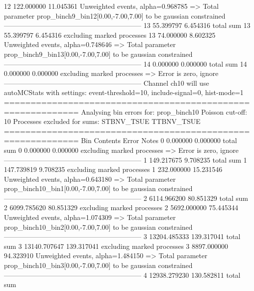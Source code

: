 12         122.000000      11.045361       Unweighted events, alpha=0.968785
  => Total parameter prop_binch9_bin12[0.00,-7.00,7.00] to be gaussian constrained
------------------------------------------------------------
13         55.399797       6.454316        total sum                     
13         55.399797       6.454316        excluding marked processes    
13         74.000000       8.602325        Unweighted events, alpha=0.748646
  => Total parameter prop_binch9_bin13[0.00,-7.00,7.00] to be gaussian constrained
------------------------------------------------------------
14         0.000000        0.000000        total sum                     
14         0.000000        0.000000        excluding marked processes    
  => Error is zero, ignore      
------------------------------------------------------------
Channel ch10 will use autoMCStats with settings: event-threshold=10, include-signal=0, hist-mode=1
============================================================
Analysing bin errors for: prop_binch10
Poisson cut-off: 10
Processes excluded for sums: STBNV_TSUE TTBNV_TSUE
============================================================
Bin        Contents        Error           Notes                         
0          0.000000        0.000000        total sum                     
0          0.000000        0.000000        excluding marked processes    
  => Error is zero, ignore      
------------------------------------------------------------
1          149.217675      9.708235        total sum                     
1          147.739819      9.708235        excluding marked processes    
1          232.000000      15.231546       Unweighted events, alpha=0.643180
  => Total parameter prop_binch10_bin1[0.00,-7.00,7.00] to be gaussian constrained
------------------------------------------------------------
2          6114.966200     80.851329       total sum                     
2          6099.785620     80.851329       excluding marked processes    
2          5692.000000     75.445344       Unweighted events, alpha=1.074309
  => Total parameter prop_binch10_bin2[0.00,-7.00,7.00] to be gaussian constrained
------------------------------------------------------------
3          13204.485333    139.317041      total sum                     
3          13140.707647    139.317041      excluding marked processes    
3          8897.000000     94.323910       Unweighted events, alpha=1.484150
  => Total parameter prop_binch10_bin3[0.00,-7.00,7.00] to be gaussian constrained
------------------------------------------------------------
4          12938.279230    130.582811      total sum                     
